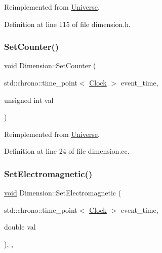Reimplemented from \mbox{\hyperlink{class_universe_a3b3da7c86a7b75e5e5c0b7972ac82a87}{Universe}}.



Definition at line 115 of file dimension.\+h.

\mbox{\label{class_dimension_a75c6a1a1e09c40b5860dc11a83384d9f}} 
\subsubsection{\texorpdfstring{Set\+Counter()}{SetCounter()}}
{\footnotesize\ttfamily \mbox{\hyperlink{glad_8h_a950fc91edb4504f62f1c577bf4727c29}{void}} Dimension\+::\+Set\+Counter (\begin{DoxyParamCaption}\item[{std\+::chrono\+::time\+\_\+point$<$ \mbox{\hyperlink{universe_8h_a0ef8d951d1ca5ab3cfaf7ab4c7a6fd80}{Clock}} $>$}]{event\+\_\+time,  }\item[{unsigned int}]{val }\end{DoxyParamCaption})\hspace{0.3cm}{\ttfamily [virtual]}}



Reimplemented from \mbox{\hyperlink{class_universe_aa22202ae740eb1355529afcb13285e91}{Universe}}.



Definition at line 24 of file dimension.\+cc.

\mbox{\label{class_dimension_ad8c18ce6358904e01594092dca9f1311}} 
\subsubsection{\texorpdfstring{Set\+Electromagnetic()}{SetElectromagnetic()}}
{\footnotesize\ttfamily \mbox{\hyperlink{glad_8h_a950fc91edb4504f62f1c577bf4727c29}{void}} Dimension\+::\+Set\+Electromagnetic (\begin{DoxyParamCaption}\item[{std\+::chrono\+::time\+\_\+point$<$ \mbox{\hyperlink{universe_8h_a0ef8d951d1ca5ab3cfaf7ab4c7a6fd80}{Clock}} $>$}]{event\+\_\+time,  }\item[{double}]{val }\end{DoxyParamCaption})\hspace{0.3cm}{\ttfamily [inline]}, {\ttfamily [final]}, {\ttfamily [virtual]}}



